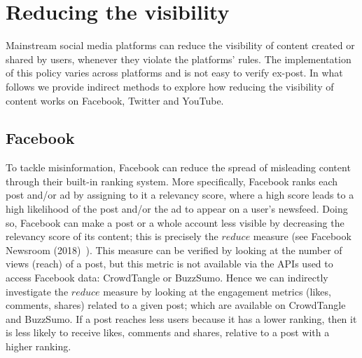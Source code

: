 \documentclass{article}
\begin{document}
\section{Reducing the visibility}

Mainstream social media platforms can reduce the visibility of content created or shared by users, whenever they violate the platforms' rules. 
The implementation of this policy varies across platforms and is not easy to verify ex-post. In what follows we provide indirect methods to explore how reducing the visibility of content works on Facebook, Twitter and YouTube. 
 

\subsection{Facebook} \label{reduce_fb}


To tackle misinformation, Facebook can reduce the spread of misleading content through their built-in ranking system. 
More specifically, Facebook ranks each post and/or ad by assigning to it a relevancy score, where a high score leads to a high likelihood of the post and/or the ad to appear on a user's newsfeed. Doing so, Facebook can make a post or a whole account less visible by decreasing the relevancy score of its content; this is precisely the $reduce$ measure (see Facebook Newsroom (2018)~\cite{newsroom2}). This measure can be verified by looking at the number of views (reach) of a post, but this metric is not available via the APIs used to access Facebook data: CrowdTangle or BuzzSumo. Hence we can indirectly investigate the $reduce$ measure by looking at the engagement metrics (likes, comments, shares) related to a given post; which are available on CrowdTangle and BuzzSumo. If a post reaches less users because it has a lower ranking, then it is less likely to receive likes, comments and shares, relative to a post with a higher ranking. 

\end{document}
